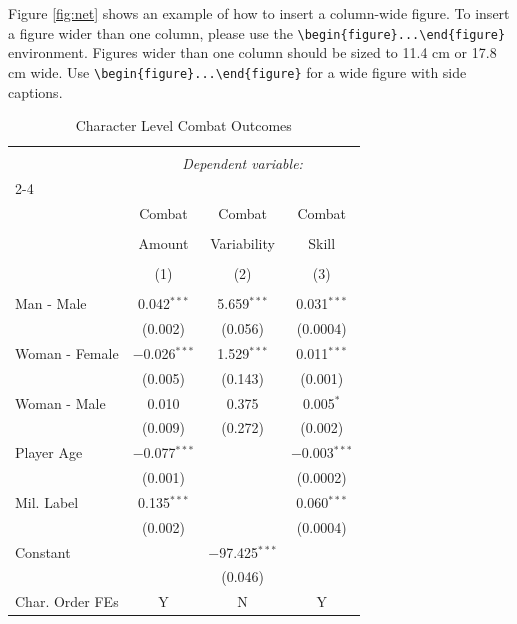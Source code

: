 \documentclass{article}
\begin{document}
Figure \ref{fig:net} shows an example of how to insert a column-wide figure. To insert a figure wider than one column, please use the \verb|\begin{figure}...\end{figure}| environment. Figures wider than one column should be sized to 11.4 cm or 17.8 cm wide. Use \verb|\begin{figure}...\end{figure}| for a wide figure with side captions.





\begin{table}%
	\caption{Character Level Combat Outcomes\label{table:char_main}}
	\begin{tabular}{@{\extracolsep{5pt}}lccc} 
		\\[-1.8ex]\hline 
		\hline \\[-1.8ex] 
		& \multicolumn{3}{c}{\textit{Dependent variable:}} \\ 
		\cline{2-4} 
		\\[-1.8ex] & Combat & Combat & Combat\\ 
		\\[-1.8ex] & Amount & Variability & Skill \\ 
		\\[-1.8ex] & (1) & (2) & (3)\\ 
		\hline \\[-1.8ex] 
		Man - Male & 0.042$^{***}$ & 5.659$^{***}$ & 0.031$^{***}$  \\ 
		& (0.002) & (0.056) & (0.0004)  \\ 
		Woman - Female & $-$0.026$^{***}$ & 1.529$^{***}$ & 0.011$^{***}$  \\ 
		& (0.005) & (0.143) & (0.001)  \\ 
		Woman - Male & 0.010 & 0.375 & 0.005$^{*}$  \\ 
		& (0.009) & (0.272) & (0.002)  \\ 
		Player Age & $-$0.077$^{***}$ &  &  $-$0.003$^{***}$\\ 
		& (0.001) &  & (0.0002) \\ 
		Mil. Label & 0.135$^{***}$ &  & 0.060$^{***}$ \\ 
		& (0.002) &  & (0.0004) \\ 
		Constant &  & $-$97.425$^{***}$ &   \\ 
		&  & (0.046) &   \\ 
		\hline 
		Char. Order FEs     &       Y&       N&     Y\\

\end{tabular}
\end{table}
\end{document}
